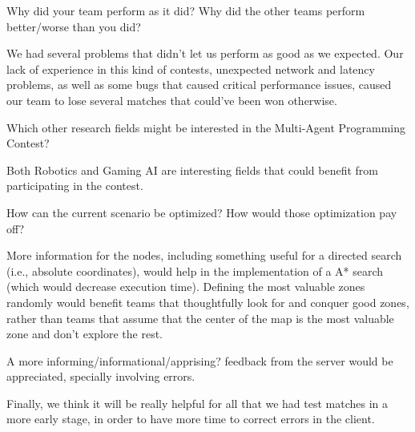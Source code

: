 \begin{question}
Why did your team perform as it did? Why did the other teams perform
better/worse than you did?
\end{question}
We had several problems that didn't let us perform as good as we expected.
Our lack of experience in this kind of contests, unexpected network and latency
problems, as well as some bugs that caused critical performance issues, caused
our team to lose several matches that could've been won otherwise.

\begin{question}
Which other research fields might be interested in the Multi-Agent
Programming Contest?
\end{question}
Both Robotics and Gaming AI are interesting fields that could benefit from
participating in the contest.

\begin{question}
How can the current scenario be optimized? How would those optimization pay
off?
\end{question}

    More information for the nodes, including something useful for a directed
    search (i.e., absolute coordinates), would help in
    the implementation of a A* search (which would decrease execution time).
    Defining the most valuable zones randomly would benefit teams that
    thoughtfully look for and conquer good zones, rather than teams that assume
    that the center of the map is the most valuable zone and don't explore the
    rest.

    A more informing/informational/apprising? feedback from the server would
    be appreciated, specially involving errors.

    Finally, we think it will be really helpful for all that we had test
    matches in a more early stage, in order to have more time to correct
    errors in the client.
